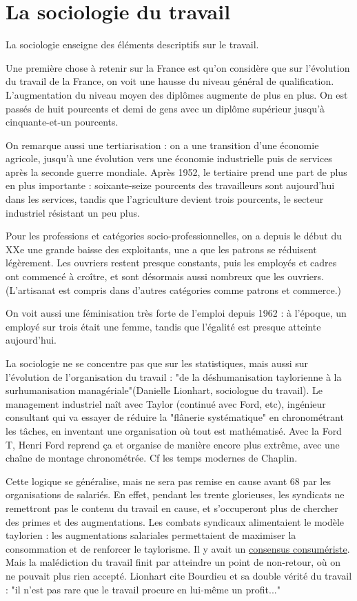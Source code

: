 \documentclass[a4paper,12pt]{book}
\begin{document}
\section{La sociologie du travail}
La sociologie enseigne des éléments descriptifs sur le travail.
\par Une première chose à retenir sur la France est qu'on considère que sur l'évolution du travail de la France, on voit une hausse du niveau général de qualification. L'augmentation du niveau moyen des diplômes augmente de plus en plus. On est passés de huit pourcents et demi de gens avec un diplôme supérieur jusqu'à cinquante-et-un pourcents.
\par On remarque aussi une tertiarisation : on a une transition d'une économie agricole, jusqu'à une évolution vers une économie industrielle puis de services après la seconde guerre mondiale. Après 1952, le tertiaire prend une part de plus en plus importante : soixante-seize pourcents des travailleurs sont aujourd'hui dans les services, tandis que l'agriculture devient trois pourcents, le secteur industriel résistant un peu plus.
\par Pour les professions et catégories socio-professionnelles, on a depuis le début du XXe une grande baisse des exploitants, une a que les patrons se réduisent légèrement. Les ouvriers restent presque constants, puis les employés et cadres ont commencé à croître, et sont désormais aussi nombreux que les ouvriers. (L'artisanat est compris dans d'autres catégories comme patrons et commerce.)
\par On voit aussi une féminisation très forte de l'emploi depuis 1962 : à l'époque, un employé sur trois était une femme, tandis que l'égalité est presque atteinte aujourd'hui.
\par La sociologie ne se concentre pas que sur les statistiques, mais aussi sur l'évolution de l'organisation du travail : "de la déshumanisation taylorienne à la surhumanisation managériale"(Danielle Lionhart, sociologue du travail). Le management industriel naît avec Taylor (continué avec Ford, etc), ingénieur consultant qui va essayer de réduire la "flânerie systématique" en chronométrant les tâches, en inventant une organisation où tout est mathématisé. Avec la Ford T, Henri Ford reprend ça et organise de manière encore plus extrême, avec une chaîne de montage chronométrée. Cf les temps modernes de Chaplin.
\par Cette logique se généralise, mais ne sera pas remise en cause avant 68 par les organisations de salariés. En effet, pendant les trente glorieuses, les syndicats ne remettront pas le contenu du travail en cause, et s'occuperont plus de chercher des primes et des augmentations. Les combats syndicaux alimentaient le modèle taylorien : les augmentations salariales permettaient de maximiser la consommation et de renforcer le taylorisme. Il y avait un \underline{consensus consumériste}. Mais la malédiction du travail finit par atteindre un point de non-retour, où on ne pouvait plus rien accepté. Lionhart cite Bourdieu et sa double vérité du travail : "il n'est pas rare que le travail procure en lui-même un profit..."
\end{document}
